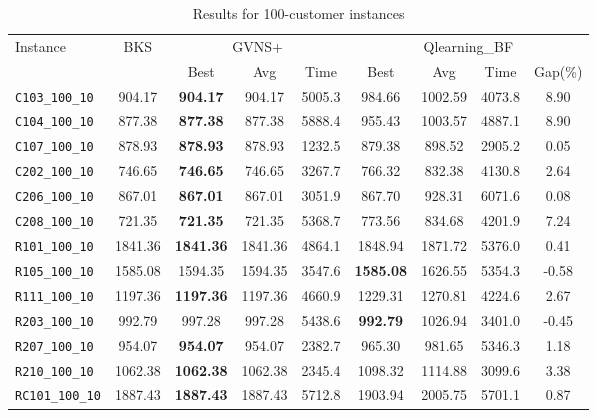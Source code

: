 \begin{table}[ht]
\centering
\small
\setlength{\tabcolsep}{5pt}
\caption{Results for 100-customer instances}
\vspace{4mm}
\begin{adjustbox}{width=\textwidth}
\begin{tabular}{l c c c c @{\hspace{8pt}} c c c c @{\hspace{8pt}}}
\toprule
\multirow{2}{*}{Instance} & \multirow{2}{*}{BKS} & \multicolumn{3}{c}{GVNS+} & \multicolumn{4}{c}{Qlearning\_BF} \\
\cmidrule(lr){3-5} \cmidrule(lr){6-9}
 &  & Best & Avg & Time & Best & Avg & Time & Gap(\%) \\
\midrule
\texttt{C103\_100\_10} & 904.17 & \textbf{904.17} & 904.17 & 5005.3 & 984.66 & 1002.59 & 4073.8 & 8.90 \\
\texttt{C104\_100\_10} & 877.38 & \textbf{877.38} & 877.38 & 5888.4 & 955.43 & 1003.57 & 4887.1 & 8.90 \\
\texttt{C107\_100\_10} & 878.93 & \textbf{878.93} & 878.93 & 1232.5 & 879.38 & 898.52 & 2905.2 & 0.05 \\
\texttt{C202\_100\_10} & 746.65 & \textbf{746.65} & 746.65 & 3267.7 & 766.32 & 832.38 & 4130.8 & 2.64 \\
\texttt{C206\_100\_10} & 867.01 & \textbf{867.01} & 867.01 & 3051.9 & 867.70 & 928.31 & 6071.6 & 0.08 \\
\texttt{C208\_100\_10} & 721.35 & \textbf{721.35} & 721.35 & 5368.7 & 773.56 & 834.68 & 4201.9 & 7.24 \\
\texttt{R101\_100\_10} & 1841.36 & \textbf{1841.36} & 1841.36 & 4864.1 & 1848.94 & 1871.72 & 5376.0 & 0.41 \\
\texttt{R105\_100\_10} & 1585.08 & 1594.35 & 1594.35 & 3547.6 & \textbf{1585.08} & 1626.55 & 5354.3 & -0.58 \\
\texttt{R111\_100\_10} & 1197.36 & \textbf{1197.36} & 1197.36 & 4660.9 & 1229.31 & 1270.81 & 4224.6 & 2.67 \\
\texttt{R203\_100\_10} & 992.79 & 997.28 & 997.28 & 5438.6 & \textbf{992.79} & 1026.94 & 3401.0 & -0.45 \\
\texttt{R207\_100\_10} & 954.07 & \textbf{954.07} & 954.07 & 2382.7 & 965.30 & 981.65 & 5346.3 & 1.18 \\
\texttt{R210\_100\_10} & 1062.38 & \textbf{1062.38} & 1062.38 & 2345.4 & 1098.32 & 1114.88 & 3099.6 & 3.38 \\
\texttt{RC101\_100\_10} & 1887.43 & \textbf{1887.43} & 1887.43 & 5712.8 & 1903.94 & 2005.75 & 5701.1 & 0.87 \\

\end{tabular}
\end{adjustbox}
\end{table}
